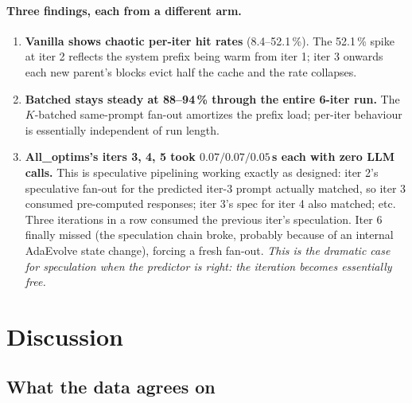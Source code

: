 \documentclass[11pt]{article}
\begin{document}
\paragraph{Three findings, each from a different arm.}
\begin{enumerate}
  \item \textbf{Vanilla shows chaotic per-iter hit rates}
    (8.4--52.1\,\%). The 52.1\,\% spike at iter 2 reflects the system
    prefix being warm from iter 1; iter 3 onwards each new parent's
    blocks evict half the cache and the rate collapses.
  \item \textbf{Batched stays steady at 88--94\,\% through the entire
    6-iter run.} The $K$-batched same-prompt fan-out amortizes the
    prefix load; per-iter behaviour is essentially independent of
    run length.
  \item \textbf{All\_optims's iters 3, 4, 5 took $0.07/0.07/0.05$\,s
    each with zero LLM calls.} This is speculative pipelining
    working exactly as designed: iter 2's speculative fan-out for
    the predicted iter-3 prompt actually matched, so iter 3 consumed
    pre-computed responses; iter 3's spec for iter 4 also matched;
    etc. Three iterations in a row consumed the previous iter's
    speculation. Iter 6 finally missed (the speculation chain broke,
    probably because of an internal AdaEvolve state change), forcing
    a fresh fan-out. \emph{This is the dramatic case for speculation
    when the predictor is right: the iteration becomes essentially
    free.}
\end{enumerate}

\section{Discussion}
\label{sec:discussion}

\subsection{What the data agrees on}
\end{document}
